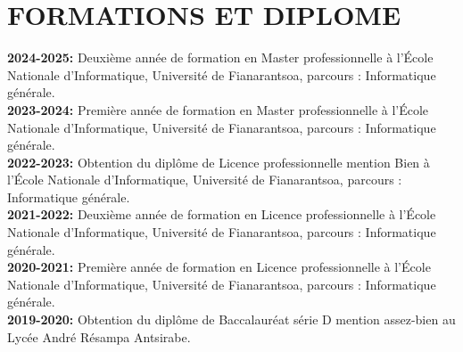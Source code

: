 \documentclass[12pt]{report}
\begin{document}
			\section*{FORMATIONS ET DIPLOME}
			\begin{center}
				\begin{minipage}{\textwidth}
					\textbf{2024-2025:} Deuxième année de formation en Master professionnelle à l’École Nationale d'Informatique, Université de Fianarantsoa, parcours : Informatique générale.\\[0.5cm]
					\textbf{2023-2024:} Première année de formation en Master professionnelle à l’École Nationale d'Informatique, Université de Fianarantsoa, parcours : Informatique générale.\\[0.5cm]
					\textbf{2022-2023:} Obtention du diplôme de Licence professionnelle mention Bien à l’École Nationale d'Informatique, Université de Fianarantsoa, parcours : Informatique générale.\\[0.5cm]
					\textbf{2021-2022:} Deuxième année de formation en Licence professionnelle à l’École Nationale d'Informatique, Université de Fianarantsoa, parcours : Informatique générale.\\[0.5cm]
					\textbf{2020-2021:} Première année de formation en Licence professionnelle à l’École Nationale d'Informatique, Université de Fianarantsoa, parcours : Informatique générale.\\[0.5cm]
					\textbf{2019-2020:} Obtention du diplôme de Baccalauréat série D mention assez-bien au Lycée André Résampa Antsirabe.
				\end{minipage}
			\end{center}
\end{document}

